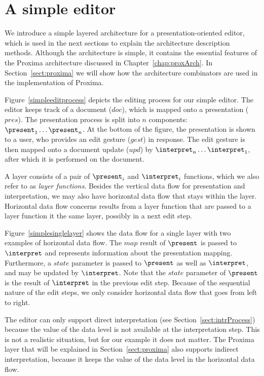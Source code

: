 \documentclass[preprint,natbib]{sigplanconf}
\begin{document}
\section{A simple editor}


We introduce a simple layered architecture for a presentation-oriented editor, which is used in the next sections to explain the architecture description methods. Although the architecture is simple, it contains the essential features of the Proxima architecture discussed in Chapter~\ref{chap:proxArch}. In Section~\ref{sect:proxima} we will show how the architecture combinators are used in the implementation of Proxima.

Figure~\ref{simpleeditprocess} depicts the editing process for our simple editor. The editor keeps track of a document ($doc$), which is mapped onto a presentation ($pres$). The presentation process is split into $n$ components: $\present_1 \dots \present_n$. At the bottom of the figure, the presentation is shown to a user, who provides an edit gesture ($gest$) in response. The edit gesture is then mapped onto a document update ($upd$) by $\interpret_n \dots \interpret_1$, after which it is performed on the document.


A layer consists of a pair of $\present_i$ and $\interpret_i$ functions, which we also refer to as {\em layer functions}. Besides the vertical data flow for presentation and interpretation, we may also have horizontal data flow that stays within the layer. Horizontal data flow concerns results from a layer function that are passed to a layer function it the same layer, possibly in a next edit step.

Figure~\ref{simplesinglelayer} shows the data flow for a single layer with two examples of horizontal data flow. The $map$ result of $\present$ is passed to $\interpret$ and represents information about the presentation mapping. Furthermore, a $state$ parameter is passed to $\present$ as well as $\interpret$, and may be updated by $\interpret$. Note that the $state$ parameter of $\present$ is the result of $\interpret$ in the previous edit step. Because of the sequential nature of the edit steps, we only consider horizontal data flow that goes from left to right.

The editor can only support direct interpretation (see Section~\ref{sect:intrProcess}) because the value of the data level is not available at the interpretation step. This is not a realistic situation, but for our example it does not matter. The Proxima layer that will be explained in Section~\ref{sect:proxima} also supports indirect interpretation, because it keeps the value of the data level in the horizontal data flow.
\end{document}
